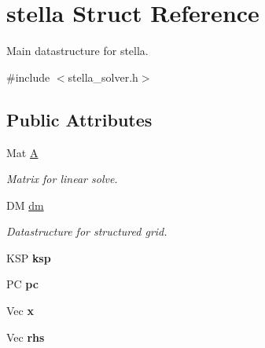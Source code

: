 \hypertarget{structstella}{}\section{stella Struct Reference}
\label{structstella}


Main datastructure for stella.  




{\ttfamily \#include $<$stella\+\_\+solver.\+h$>$}

\subsection*{Public Attributes}
\begin{DoxyCompactItemize}
\item 
\mbox{\label{structstella_a09d8cdb7d92810c812f7d698a0f1a4b4}} 
Mat \mbox{\hyperlink{structstella_a09d8cdb7d92810c812f7d698a0f1a4b4}{A}}
\begin{DoxyCompactList}\small\item\em Matrix for linear solve. \end{DoxyCompactList}\item 
\mbox{\label{structstella_ac724e6b2d361304142c67ce93ff57501}} 
DM \mbox{\hyperlink{structstella_ac724e6b2d361304142c67ce93ff57501}{dm}}
\begin{DoxyCompactList}\small\item\em Datastructure for structured grid. \end{DoxyCompactList}\item 
\mbox{\label{structstella_a18c7afda86d38f4cb8fe7eb32daf1325}} 
K\+SP {\bfseries ksp}
\item 
\mbox{\label{structstella_a0f8ea4b1a1bab930af2569bfdcc0bf4c}} 
PC {\bfseries pc}
\item 
\mbox{\label{structstella_a750f469d7d2f9ffaec59387b0f96f268}} 
Vec {\bfseries x}
\item 
\mbox{\label{structstella_a5fba06f51a3081fbb1873a43e556e4ad}} 
Vec {\bfseries rhs}
\item 
\mbox{\label{structstella_a58a97ffe5282902bff30e2ff96b9dddd}} 

\end{DoxyCompactItemize}
